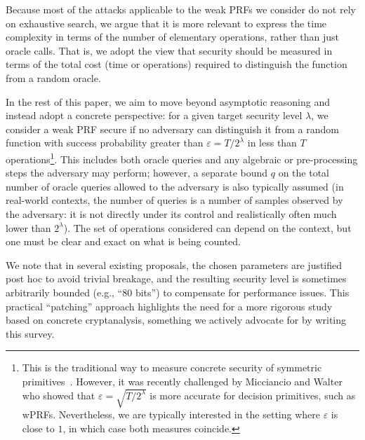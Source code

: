 \documentclass[journal=tosc,submission]{iacrtrans}
\theoremstyle{theorem}
\renewcommand\secpar{\ensuremath{\lambda}\xspace}
\begin{document}
Because most of the attacks applicable to the weak PRFs we consider do not rely on exhaustive search, we argue that it is more relevant to express the time complexity in terms of the number of elementary operations, rather than just oracle calls. That is, we adopt the view that security should be measured in terms of the total cost (time or operations) required to distinguish the function from a random oracle.

In the rest of this paper, we aim to move beyond asymptotic reasoning and instead adopt a concrete perspective: for a given target security level $\lambda$, we consider a weak PRF secure if no adversary can distinguish it from a random function with success probability greater than $\varepsilon = T/2^\lambda$ in less than $T$ operations\footnote{This is the traditional way to measure concrete security of symmetric primitives~\cite{C:DodSte09}. However, it was recently challenged by Micciancio and Walter~\cite{EC:MicWal18} who showed that $\varepsilon = \sqrt{T/2^\secpar}$ is more accurate for decision primitives, such as wPRFs. Nevertheless, we are typically interested in the setting where $\varepsilon$ is close to $1$, in which case both measures coincide.}. This includes both oracle queries and any algebraic or pre-processing steps the adversary may perform; however, a separate bound $q$ on the total number of oracle queries allowed to the adversary is also typically assumed (in real-world contexts, the number of queries is a number of samples observed by the adversary: it is not directly under its control and realistically often much lower than $2^\lambda$). The set of operations considered can depend on the context, but one must be clear and exact on what is being counted.

We note that in several existing proposals, the chosen parameters are justified post hoc to avoid trivial breakage, and the resulting security level is sometimes arbitrarily bounded (e.g., ``80 bits'') to compensate for performance issues. This practical “patching” approach highlights the need for a more rigorous study based on concrete cryptanalysis, something we actively advocate for by writing this survey.

\end{document}
